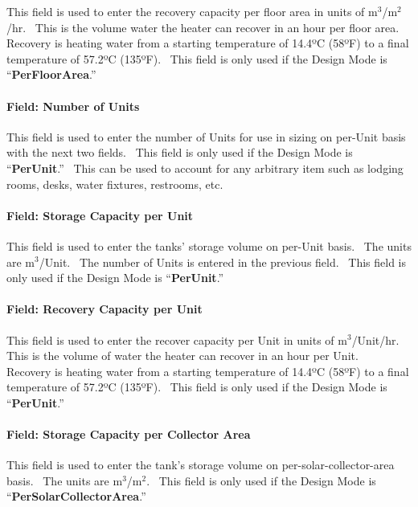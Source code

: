 This field is used to enter the recovery capacity per floor area in units of m\(^{3}\)/m\(^{2}\)/hr.~ This is the volume water the heater can recover in an hour per floor area.~ Recovery is heating water from a starting temperature of 14.4ºC (58ºF) to a final temperature of 57.2ºC (135ºF).~ This field is only used if the Design Mode is ``\textbf{PerFloorArea}.''

\paragraph{Field: Number of Units}\label{field-number-of-units-000}

This field is used to enter the number of Units for use in sizing on per-Unit basis with the next two fields.~ This field is only used if the Design Mode is ``\textbf{PerUnit}.''~ This can be used to account for any arbitrary item such as lodging rooms, desks, water fixtures, restrooms, etc.

\paragraph{Field: Storage Capacity per Unit}\label{field-storage-capacity-per-unit}

This field is used to enter the tanks' storage volume on per-Unit basis.~ The units are m\(^{3}\)/Unit.~ The number of Units is entered in the previous field.~ This field is only used if the Design Mode is ``\textbf{PerUnit}.''

\paragraph{Field: Recovery Capacity per Unit}\label{field-recovery-capacity-per-unit}

This field is used to enter the recover capacity per Unit in units of m\(^{3}\)/Unit/hr.~ This is the volume of water the heater can recover in an hour per Unit.~ Recovery is heating water from a starting temperature of 14.4ºC (58ºF) to a final temperature of 57.2ºC (135ºF).~ This field is only used if the Design Mode is ``\textbf{PerUnit}.''

\paragraph{Field: Storage Capacity per Collector Area}\label{field-storage-capacity-per-collector-area}

This field is used to enter the tank's storage volume on per-solar-collector-area basis.~ The units are m\(^{3}\)/m\(^{2}\).~ This field is only used if the Design Mode is ``\textbf{PerSolarCollectorArea}.''

